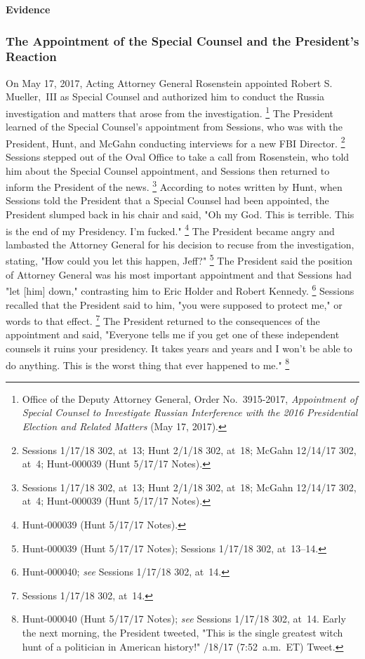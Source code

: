 {\begin{center}
\textbf{Evidence}
\end{center}

\subsubsection{The Appointment of the Special Counsel and the President's Reaction}

On May 17, 2017, Acting Attorney General Rosenstein appointed Robert S. Mueller,~III as Special Counsel and authorized him to conduct the Russia investigation and matters that arose from the investigation.%
\footnote{Office of the Deputy Attorney General, Order No.~3915-2017, \textit{Appointment of Special Counsel to Investigate Russian Interference with the 2016 Presidential Election and Related Matters} (May 17, 2017).}
The President learned of the Special Counsel's appointment from Sessions, who was with the President, Hunt, and McGahn conducting interviews for a new FBI Director.%
\footnote{Sessions 1/17/18 302, at~13;
Hunt 2/1/18 302, at~18;
McGahn 12/14/17 302, at~4;
Hunt-000039 (Hunt 5/17/17 Notes).}
Sessions stepped out of the Oval Office to take a call from Rosenstein, who told him about the Special Counsel appointment, and Sessions then returned to inform the President of the news.%
\footnote{Sessions 1/17/18 302, at~13;
Hunt 2/1/18 302, at~18;
McGahn 12/14/17 302, at~4;
Hunt-000039 (Hunt 5/17/17 Notes).}
According to notes written by Hunt, when Sessions told the President that a Special Counsel had been appointed, the President slumped back in his chair and said, "Oh my God.
This is terrible.
This is the end of my Presidency.
I'm fucked."%
\footnote{Hunt-000039 (Hunt 5/17/17 Notes).}
The President became angry and lambasted the Attorney General for his decision to recuse from the investigation, stating, "How could you let this happen, Jeff?"%
\footnote{Hunt-000039 (Hunt 5/17/17 Notes);
Sessions 1/17/18 302, at~13--14.}
The President said the position of Attorney General was his most important appointment and that Sessions had "let [him] down," contrasting him to Eric Holder and Robert Kennedy.%
\footnote{Hunt-000040;
\textit{see} Sessions 1/17/18 302, at~14.}
Sessions recalled that the President said to him, "you were supposed to protect me," or words to that effect.%
\footnote{Sessions 1/17/18 302, at~14.}
The President returned to the consequences of the appointment and said, "Everyone tells me if you get one of these independent counsels it ruins your presidency.
It takes years and years and I won't be able to do anything.
This is the worst thing that ever happened to me."%
\footnote{Hunt-000040 (Hunt 5/17/17 Notes);
\textit{see} Sessions 1/17/18 302, at~14.
Early the next morning, the President tweeted, "This is the single greatest witch hunt of a politician in American history!"
/18/17 (7:52~a.m.~ET) Tweet.}

}
